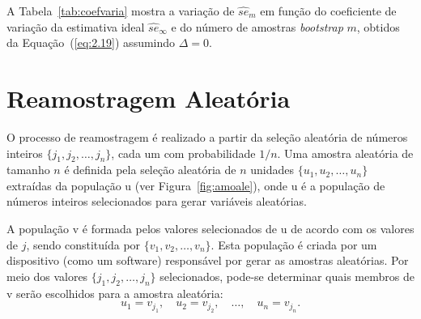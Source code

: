 A Tabela~\ref{tab:coefvaria} mostra a variação de $\widehat{se}_m$ em função do coeficiente de variação da estimativa ideal $\widehat{se}_{\infty}$ e do número de amostras \textit{bootstrap} $m$, obtidos da Equação~(\ref{eq:2.19}) assumindo $\Delta = 0$.

\section{Reamostragem Aleatória}

O processo de reamostragem é realizado a partir da seleção aleatória de números inteiros $\{j_1, j_2, \ldots, j_n\}$, cada um com probabilidade $1/n$. Uma amostra aleatória de tamanho $n$ é definida pela seleção aleatória de $n$ unidades $\{u_1, u_2, \ldots, u_n\}$ extraídas da população \gls{u} (ver Figura~\ref{fig:amoale}), onde \gls{u} é a população de números inteiros selecionados para gerar variáveis aleatórias. 

A população \gls{v} é formada pelos valores selecionados de \gls{u} de acordo com os valores de $j$, sendo constituída por $\{v_1, v_2, \ldots, v_n\}$. Esta população é criada por um dispositivo (como um software) responsável por gerar as amostras aleatórias. Por meio dos valores $\{j_1, j_2, \ldots, j_n\}$ selecionados, pode-se determinar quais membros de \gls{v} serão escolhidos para a amostra aleatória:
\begin{equation*}
    u_1 = v_{j_1}, \quad u_2 = v_{j_2}, \quad \ldots, \quad u_n = v_{j_n}.
\end{equation*}

